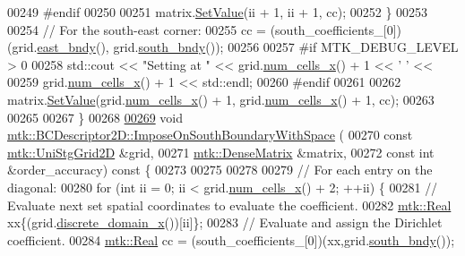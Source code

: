 \begin{DoxyCode}
00249 \textcolor{preprocessor}{    #endif}
00250 
00251     matrix.\hyperlink{classmtk_1_1DenseMatrix_a784ce5784109ac86bfb9d8562b334b13}{SetValue}(ii + 1, ii + 1, cc);
00252   \}
00253 
00254   \textcolor{comment}{// For the south-east corner:}
00255   cc = (south\_coefficients\_[0])(grid.\hyperlink{classmtk_1_1UniStgGrid2D_a03f689eb29a6369b82ce1207c655d5ff}{east\_bndy}(), grid.\hyperlink{classmtk_1_1UniStgGrid2D_a1442eaf219f099d0ebf46a170fdebf92}{south\_bndy}());
00256 
00257 \textcolor{preprocessor}{  #if MTK\_DEBUG\_LEVEL > 0}
00258   std::cout << \textcolor{stringliteral}{"Setting at "} << grid.\hyperlink{classmtk_1_1UniStgGrid2D_a2d182866a398aba8e4829590e85bf939}{num\_cells\_x}() + 1 << \textcolor{charliteral}{' '} <<
00259     grid.\hyperlink{classmtk_1_1UniStgGrid2D_a2d182866a398aba8e4829590e85bf939}{num\_cells\_x}() + 1 << std::endl;
00260 \textcolor{preprocessor}{  #endif}
00261 
00262   matrix.\hyperlink{classmtk_1_1DenseMatrix_a784ce5784109ac86bfb9d8562b334b13}{SetValue}(grid.\hyperlink{classmtk_1_1UniStgGrid2D_a2d182866a398aba8e4829590e85bf939}{num\_cells\_x}() + 1, grid.\hyperlink{classmtk_1_1UniStgGrid2D_a2d182866a398aba8e4829590e85bf939}{num\_cells\_x}() + 1, cc);
00263 
00265 
00267 \}
00268 
\hypertarget{mtk__bc__descriptor__2d_8cc_source_l00269}{}\hyperlink{classmtk_1_1BCDescriptor2D_af30c275cf06176a2ae9722014142c810}{00269} \textcolor{keywordtype}{void} \hyperlink{classmtk_1_1BCDescriptor2D_af30c275cf06176a2ae9722014142c810}{mtk::BCDescriptor2D::ImposeOnSouthBoundaryWithSpace}
      (
00270     \textcolor{keyword}{const} \hyperlink{classmtk_1_1UniStgGrid2D}{mtk::UniStgGrid2D} &grid,
00271     \hyperlink{classmtk_1_1DenseMatrix}{mtk::DenseMatrix} &matrix,
00272     \textcolor{keyword}{const} \textcolor{keywordtype}{int} &order\_accuracy)\textcolor{keyword}{ const }\{
00273 
00275 
00278 
00279   \textcolor{comment}{// For each entry on the diagonal:}
00280   \textcolor{keywordflow}{for} (\textcolor{keywordtype}{int} ii = 0; ii < grid.\hyperlink{classmtk_1_1UniStgGrid2D_a2d182866a398aba8e4829590e85bf939}{num\_cells\_x}() + 2; ++ii) \{
00281     \textcolor{comment}{// Evaluate next set spatial coordinates to evaluate the coefficient.}
00282     \hyperlink{group__c01-roots_gac080bbbf5cbb5502c9f00405f894857d}{mtk::Real} xx\{(grid.\hyperlink{classmtk_1_1UniStgGrid2D_ab2f70cf5cd0a2d5486992d9f2f8baa4a}{discrete\_domain\_x}())[ii]\};
00283     \textcolor{comment}{// Evaluate and assign the Dirichlet coefficient.}
00284     \hyperlink{group__c01-roots_gac080bbbf5cbb5502c9f00405f894857d}{mtk::Real} cc = (south\_coefficients\_[0])(xx,grid.\hyperlink{classmtk_1_1UniStgGrid2D_a1442eaf219f099d0ebf46a170fdebf92}{south\_bndy}());

\end{DoxyCode}
